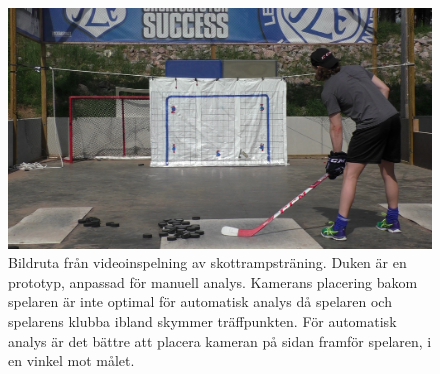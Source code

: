 \documentclass[a4paper,12pt]{article}
\begin{document}
\begin{figure}[ht]
  \centering
  \includegraphics[width=\linewidth]{photos/skottrampstraning-leksands-if.png}
  \caption{Bildruta från videoinspelning av skottrampsträning. Duken är
    en prototyp, anpassad för manuell analys. Kamerans placering bakom
    spelaren är inte optimal för automatisk analys då spelaren och spelarens
    klubba ibland skymmer träffpunkten. För automatisk analys är det bättre
    att placera kameran på sidan framför spelaren, i en vinkel mot målet.
  \label{fig:leksand}}
\end{figure}
\end{document}
